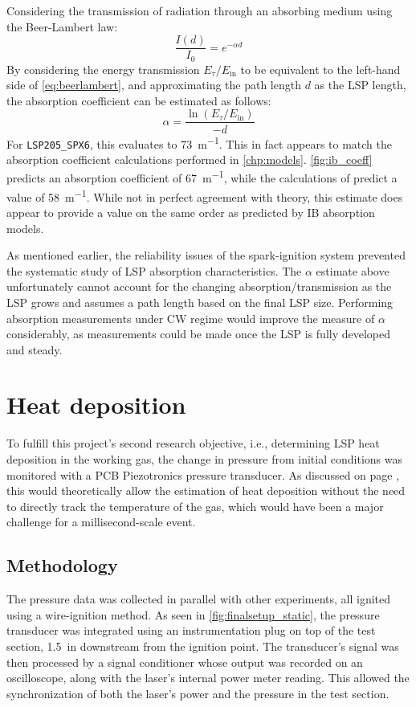             Considering the transmission of radiation through an absorbing medium using the Beer-Lambert law:
            \begin{equation} \label{eq:beerlambert}
                \frac{I(d)}{I_0} = e^{-\alpha d}
            \end{equation}
            By considering the energy transmission $E_\tau/E_\mathrm{in}$ to be equivalent to the left-hand side of \autoref{eq:beerlambert}, and approximating the path length $d$ as the LSP length, the absorption coefficient can be estimated as follows:
            \begin{equation}
                \alpha = \frac{\ln{(E_\tau/E_\mathrm{in})}}{-d}
            \end{equation}
            For \texttt{LSP205\_SPX6}, this evaluates to \qty{73}{m^{-1}}. This in fact appears to match the absorption coefficient calculations performed in \autoref{chp:models}. \autoref{fig:ib_coeff} predicts an absorption coefficient of \qty{67}{m^{-1}}, while the calculations of \textcite{matsuiGeneratingConditionsArgon2019} predict a value of \qty{58}{m^{-1}}. While not in perfect agreement with theory, this estimate does appear to provide a value on the same order as predicted by IB absorption models.

            As mentioned earlier, the reliability issues of the spark-ignition system prevented the systematic study of LSP absorption characteristics. The $\alpha$ estimate above unfortunately cannot account for the changing absorption/transmission as the LSP grows and assumes a path length based on the final LSP size. Performing absorption measurements under CW regime would improve the measure of $\alpha$ considerably, as measurements could be made once the LSP is fully developed and steady.

    \section{Heat deposition}
        To fulfill this project's second research objective, i.e., determining LSP heat deposition in the working gas, the change in pressure from initial conditions was monitored with a PCB Piezotronics pressure transducer. As discussed on page \pageref{sec:design_pressuresensor}, this would theoretically allow the estimation of heat deposition without the need to directly track the temperature of the gas, which would have been a major challenge for a millisecond-scale event.

        \subsection{Methodology}
            The pressure data was collected in parallel with other experiments, all ignited using a wire-ignition method. As seen in \autoref{fig:finalsetup_static}, the pressure transducer was integrated using an instrumentation plug on top of the test section, \qty{1.5}{in} downstream from the ignition point. The transducer's signal was then processed by a signal conditioner whose output was recorded on an oscilloscope, along with the laser's internal power meter reading. This allowed the synchronization of both the laser's power and the pressure in the test section.

